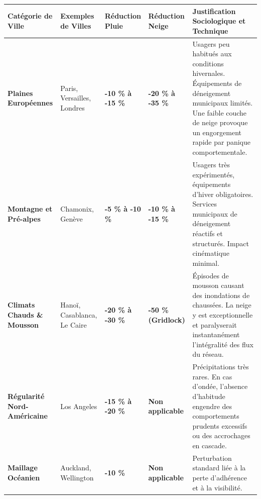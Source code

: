 \documentclass[10pt, a4paper]{article}
\newcounter{none}
\begin{document}
{\def\LTcaptype{none} %
\begin{longtable}[]{@{}
  >{\raggedright\arraybackslash}p{}
  >{\raggedright\arraybackslash}p{}
  >{\centering\arraybackslash}p{}
  >{\centering\arraybackslash}p{}
  >{\raggedright\arraybackslash}p{}@{}}
\toprule\noalign{}
\begin{minipage}[b]{\linewidth}\raggedright
Catégorie de Ville
\end{minipage} & \begin{minipage}[b]{\linewidth}\raggedright
Exemples de Villes
\end{minipage} & \begin{minipage}[b]{\linewidth}\centering
Réduction Pluie
\end{minipage} & \begin{minipage}[b]{\linewidth}\centering
Réduction Neige
\end{minipage} & \begin{minipage}[b]{\linewidth}\raggedright
Justification Sociologique et Technique
\end{minipage} \\
\midrule\noalign{}
\endhead
\bottomrule\noalign{}
\endlastfoot
\textbf{Plaines Européennes} & Paris, Versailles, Londres & \textbf{-10
\% à -15 \%} & \textbf{-20 \% à -35 \%} & Usagers peu habitués aux
conditions hivernales. Équipements de déneigement municipaux limités.
Une faible couche de neige provoque un engorgement rapide par panique
comportementale. \\
\textbf{Montagne et Pré-alpes} & Chamonix, Genève & \textbf{-5 \% à -10
\%} & \textbf{-10 \% à -15 \%} & Usagers très expérimentés, équipements
d'hiver obligatoires. Services municipaux de déneigement réactifs et
structurés. Impact cinématique minimal. \\
\textbf{Climats Chauds \& Mousson} & Hanoï, Casablanca, Le Caire &
\textbf{-20 \% à -30 \%} & \textbf{-50 \% (Gridlock)} & Épisodes de
mousson causant des inondations de chaussées. La neige y est
exceptionnelle et paralyserait instantanément l'intégralité des flux du
réseau. \\
\textbf{Régularité Nord-Américaine} & Los Angeles & \textbf{-15 \% à -20
\%} & \textbf{Non applicable} & Précipitations très rares. En cas
d'ondée, l'absence d'habitude engendre des comportements prudents
excessifs ou des accrochages en cascade. \\
\textbf{Maillage Océanien} & Auckland, Wellington & \textbf{-10 \%} &
\textbf{Non applicable} & Perturbation standard liée à la perte
d'adhérence et à la visibilité. \\
\end{longtable}
}
\end{document}
